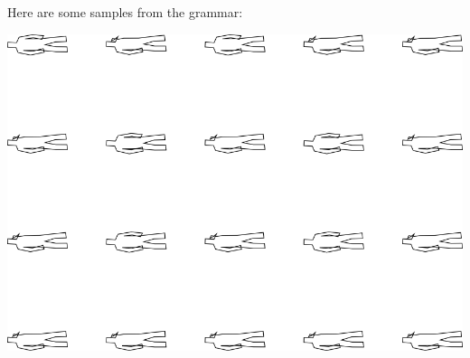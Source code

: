 Here are some samples from the grammar:

\includegraphics[width=6in]{output/3.learning/incremental/gram.1.d/samples.png}

